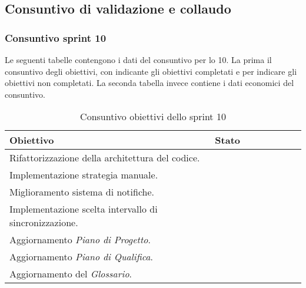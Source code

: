 \subsection{Consuntivo di validazione e collaudo}

\subsubsection{Consuntivo sprint 10}
Le seguenti tabelle contengono i dati del consuntivo per lo  10. La prima il consuntivo degli obiettivi, con \checkmark{} indicante gli obiettivi completati e \xmark{} per indicare gli obiettivi non completati. La seconda tabella invece contiene i dati economici del consuntivo.\newline{}
\begin{table}[H]
		\begin{center}
			\setlength{\aboverulesep}{0pt}
			\setlength{\belowrulesep}{0pt}
			\setlength{\extrarowheight}{.75ex}
			\begin{tabular}{ l c c c c c c c }
				\rowcolor{AzzurroGruppo!30} 
				\textbf{Obiettivo} & \textbf{Stato} \\
				\toprule
				Rifattorizzazione della architettura del codice. & \checkmark{} \\
				Implementazione strategia manuale. & \checkmark{} \\
				Miglioramento sistema di notifiche. & \checkmark{} \\
				Implementazione scelta intervallo di sincronizzazione. & \checkmark{} \\
				Aggiornamento \textit{Piano di Progetto}. & \checkmark{} \\
				Aggiornamento \textit{Piano di Qualifica}. & \checkmark{} \\
				Aggiornamento del \textit{Glossario}. & \checkmark{} \\
				\bottomrule
			\end{tabular}
			\caption{Consuntivo obiettivi dello sprint 10}
		\end{center}
	\end{table}

